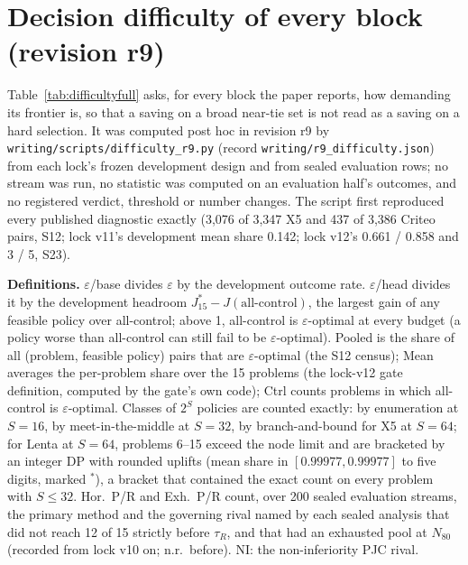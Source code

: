 \documentclass[sigconf,anonymous,review]{acmart}
\newcommand{\eps}{\varepsilon}
\begin{document}
\section{Decision difficulty of every block (revision r9)}\label{app:difficulty}

Table~\ref{tab:difficultyfull} asks, for every block the paper reports, how demanding its frontier is, so that a saving on a broad near-tie set is not read as a saving on a hard selection. It was computed post hoc in revision r9 by \texttt{writing/scripts/difficulty\_r9.py} (record \texttt{writing/r9\_difficulty.json}) from each lock's frozen development design and from sealed evaluation rows; no stream was run, no statistic was computed on an evaluation half's outcomes, and no registered verdict, threshold or number changes. The script first reproduced every published diagnostic exactly (3,076 of 3,347 X5 and 437 of 3,386 Criteo pairs, S12; lock v11's development mean share 0.142; lock v12's 0.661 / 0.858 and 3 / 5, S23).

\textbf{Definitions.} $\eps$/base divides $\eps$ by the development outcome rate. $\eps$/head divides it by the development headroom $J^*_{15} - J(\text{all-control})$, the largest gain of any feasible policy over all-control; above 1, all-control is $\eps$-optimal at every budget (a policy worse than all-control can still fail to be $\eps$-optimal). Pooled is the share of all (problem, feasible policy) pairs that are $\eps$-optimal (the S12 census); Mean averages the per-problem share over the 15 problems (the lock-v12 gate definition, computed by the gate's own code); Ctrl counts problems in which all-control is $\eps$-optimal. Classes of $2^S$ policies are counted exactly: by enumeration at $S = 16$, by meet-in-the-middle at $S = 32$, by branch-and-bound for X5 at $S = 64$; for Lenta at $S = 64$, problems 6--15 exceed the node limit and are bracketed by an integer DP with rounded uplifts (mean share in $[0.99977, 0.99977]$ to five digits, marked $^*$), a bracket that contained the exact count on every problem with $S \le 32$. Hor.\ P/R and Exh.\ P/R count, over 200 sealed evaluation streams, the primary method and the governing rival named by each sealed analysis that did not reach 12 of 15 strictly before $\tau_R$, and that had an exhausted pool at $N_{80}$ (recorded from lock v10 on; n.r.\ before). NI: the non-inferiority PJC rival.

\begin{table}[t]
\caption{\textbf{Decision difficulty of every reported block} (post hoc, revision r9). Development columns use development truth; evaluation columns use sealed evaluation rows only. $^\dagger$Descriptive blocks. $^*$Exact bracket (see text).}
\label{tab:difficultyfull}
\small

\end{table}
\end{document}
